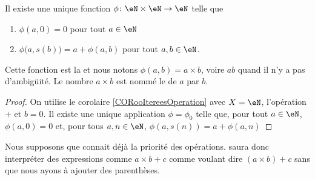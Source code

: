 \begin{propositionDef}      \label{PROPooBBQPooRgPOjf}
	Il existe une unique fonction \( \phi \colon \eN\times \eN\to \eN\) telle que
	\begin{enumerate}
		\item       \label{ITEMooNTUUooDAUVsV}
		      \( \phi (a,0)=0\) pour tout \( a\in \eN\)
		\item       \label{ITEMooPPZZooQQabwn}
		      \( \phi \big( a,s(b) \big) = a + \phi(a,b)\) pour tout \( a,b\in \eN\).
	\end{enumerate}
	Cette fonction est la  et nous notons \( \phi (a,b)=a\times b\), voire \( ab\) quand il n'y a pas d'ambigüité. Le nombre \( a\times b\) est nommé le  de \( a\) par \( b\).
\end{propositionDef}

\begin{proof}
	On utilise le corolaire \ref{CORooItereesOperation} avec \( X = \eN \), l'opération \( + \) et \( b = 0 \). Il existe une unique application \( \phi = \phi_0 \) telle que, pour tout \( a \in \eN \), \( \phi (a,0) = 0 \) et, pour tous \(a, n \in \eN \), \( \phi(a, s(n)) = a + \phi(a, n) \)
\end{proof}

\begin{normaltext}	\label{NORMooPrioriteOperations}
	Nous supposons que  connait déjà la priorité des opérations.  saura donc interpréter des expressions comme \( a\times b+c\) comme voulant dire \( (a\times b)+c\) sans que nous ayons à ajouter des parenthèses.
\end{normaltext}

